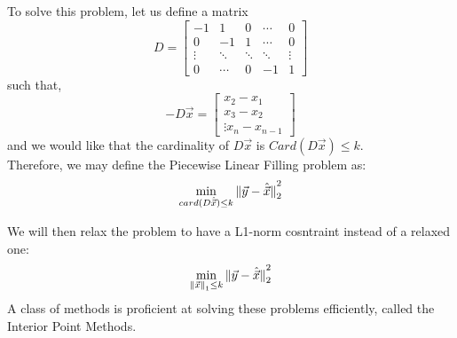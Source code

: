 To solve this problem, let us define a matrix
\[
    D =
    \begin{bmatrix}
        -1 & 1 & 0 & \cdots & 0 \\
        0 & -1 & 1 & \cdots & 0 \\
        \vdots & \ddots & \ddots & \ddots & \vdots \\
        0 & \cdots & 0 & -1 & 1
    \end{bmatrix}
\]
such that,
\[
    -D \vec{x} =
    \begin{bmatrix}
        x_2 - x_1 \\
        x_3 - x_2 \\
        \vdots
        x_n - x_{n - 1}
    \end{bmatrix}
\]
and we would like that the cardinality of $D \vec{x}$ is $Card(D \vec{x}) \leq k$. \\
Therefore, we may define the Piecewise Linear Filling problem as:
\[
    \min_{card(D \hat{\vec{x}}) \leq k}
    \pnorm[2]{\vec{y} - \hat{\vec{x}}}{2}
\]

We will then relax the problem to have a L1-norm cosntraint instead of a relaxed one:
\[
    \min_{\pnorm{\vec{x}}{1} \leq k}
    \pnorm[2]{\vec{y} - \hat{\vec{x}}}{2}
\]
A class of methods is proficient at solving these problems efficiently, called the Interior Point Methods.

